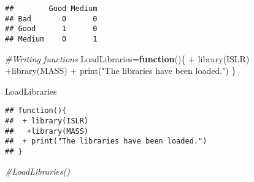 \documentclass[
]{article}
\newenvironment{Shaded}{\begin{snugshade}}{\end{snugshade}}
\newcommand{\CommentTok}[1]{\textcolor[rgb]{0.56,0.35,0.01}{\textit{#1}}}
\newcommand{\ControlFlowTok}[1]{\textcolor[rgb]{0.13,0.29,0.53}{\textbf{#1}}}
\newcommand{\FunctionTok}[1]{\textcolor[rgb]{0.00,0.00,0.00}{#1}}
\newcommand{\NormalTok}[1]{#1}
\newcommand{\OtherTok}[1]{\textcolor[rgb]{0.56,0.35,0.01}{#1}}
\newcommand{\SpecialCharTok}[1]{\textcolor[rgb]{0.00,0.00,0.00}{#1}}
\newcommand{\StringTok}[1]{\textcolor[rgb]{0.31,0.60,0.02}{#1}}
\begin{document}
\begin{verbatim}
##        Good Medium
## Bad       0      0
## Good      1      0
## Medium    0      1
\end{verbatim}

\begin{Shaded}
\begin{Highlighting}[]
\CommentTok{\#Writing functions}
\NormalTok{LoadLibraries}\OtherTok{=}\ControlFlowTok{function}\NormalTok{()\{}
 \SpecialCharTok{+} \FunctionTok{library}\NormalTok{(ISLR)}
  \SpecialCharTok{+}\FunctionTok{library}\NormalTok{(MASS)}
 \SpecialCharTok{+} \FunctionTok{print}\NormalTok{(}\StringTok{"The libraries have been loaded."}\NormalTok{)}
\NormalTok{\}}
\end{Highlighting}
\end{Shaded}

\begin{Shaded}
\begin{Highlighting}[]
\NormalTok{LoadLibraries}
\end{Highlighting}
\end{Shaded}

\begin{verbatim}
## function(){
##  + library(ISLR)
##   +library(MASS)
##  + print("The libraries have been loaded.")
## }
\end{verbatim}

\begin{Shaded}
\begin{Highlighting}[]
\CommentTok{\#LoadLibraries()}
\end{Highlighting}
\end{Shaded}
\end{document}
